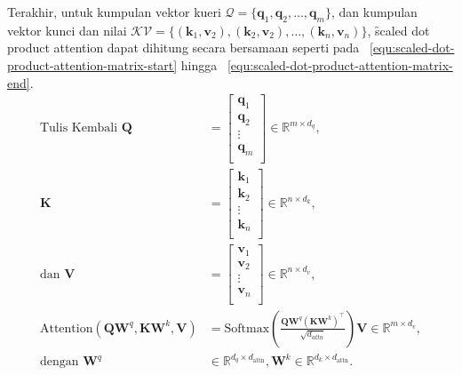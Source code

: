 	Terakhir, untuk kumpulan vektor kueri $\mathcal{Q} = \{\mathbf{q}_1, \mathbf{q}_2, \dots, \mathbf{q}_m\}$, dan kumpulan vektor kunci dan nilai $\mathcal{KV} = \{(\mathbf{k}_1, \mathbf{v}_2), (\mathbf{k}_2, \mathbf{v}_2), \dots, (\mathbf{k}_n, \mathbf{v}_n)\}$, \f{scaled dot product attention} dapat dihitung secara bersamaan seperti pada \equ~\ref{equ:scaled-dot-product-attention-matrix-start} hingga \equ~\ref{equ:scaled-dot-product-attention-matrix-end}.
	\begin{align}
	\label{equ:scaled-dot-product-attention-matrix-start}
	\text{Tulis Kembali } \mathbf{Q} &= \begin{bmatrix}
		\mathbf{q}_1 \\
		\mathbf{q}_2 \\
		\vdots \\
		\mathbf{q}_m \\
	\end{bmatrix} \in \mathbb{R}^{m \times d_{q}}, \\
	\mathbf{K} &= \begin{bmatrix}
		\mathbf{k}_1 \\
		\mathbf{k}_2 \\
		\vdots \\
		\mathbf{k}_n \\
	\end{bmatrix} \in \mathbb{R}^{n \times d_{k}}, \\
	\text{dan } \mathbf{V} &= \begin{bmatrix}
		\mathbf{v}_1 \\
		\mathbf{v}_2 \\
		\vdots \\
		\mathbf{v}_n \\
	\end{bmatrix} \in \mathbb{R}^{n \times d_{v}}, \\
	\label{equ:scaled-dot-product-attention-matrix-end}
	\text{Attention}(\mathbf{QW}^q, \mathbf{KW}^k, \mathbf{V}) &= \text{Softmax}( \frac{\mathbf{QW}^q (\mathbf{KW}^k)^{\top}}{\sqrt{d_{attn}}}) \mathbf{V} \in \mathbb{R}^{m \times d_{v}}, \\
	\text{dengan } \mathbf{W}^q &\in \mathbb{R}^{d_q \times d_{\text{attn}}}, \mathbf{W}^k \in \mathbb{R}^{d_k \times d_{\text{attn}}}.
	\end{align}

